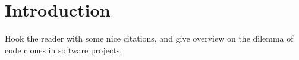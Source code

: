 \section{Introduction}
\label{sec:intro}

Hook the reader with some nice citations, and give overview on the dilemma of code clones in software projects.
